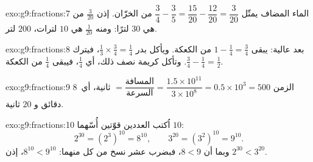 \begin{solution}{exo:g9:fractions:7}
الماء المضاف يمثّل
$\dfrac34 - \dfrac35 = \dfrac{15}{20} - \dfrac{12}{20} = \dfrac{3}{20}$
من الخزّان. إذن $\frac{3}{20}$ من  هي $30$ لترًا:
ومنه $\frac{1}{20}$ هي $10$ لترات،  $200$ لتر.
\end{solution}

\begin{solution}{exo:g9:fractions:8}
بعد عالية: يبقى $1 - \frac14 = \frac34$ من الكعكة. ويأكل بدر
$\frac13 \times \frac34 = \frac14$، فيترك
$\frac34 - \frac14 = \frac12$. وتأكل كريمة نصف ذلك، أي $\frac14$،
فيبقى $\frac14$ من الكعكة.
\end{solution}

\begin{solution}{exo:g9:fractions:9}
الزمن $= \dfrac{\text{المسافة}}{\text{السرعة}} =
\dfrac{1.5 \times 10^{11}}{3 \times 10^8} = 0.5 \times 10^3 = 500$
ثانية، أي\ $8$ دقائق و $20$ ثانية.
\end{solution}

\begin{solution}{exo:g9:fractions:10}
اُكتب العددين قوّتين أُسّهما $10$:
\[
2^{30} = \left(2^3\right)^{10} = 8^{10},
\qquad
3^{20} = \left(3^2\right)^{10} = 9^{10}.
\]
وبما أن $8 < 9$، فبضرب عشر نسخ من كل منهما: $8^{10} < 9^{10}$، إذن
$2^{30} < 3^{20}$.
\end{solution}


